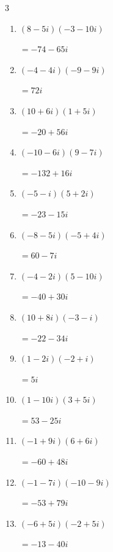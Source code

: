 \begin{multicols}{3}
\begin{enumerate}
        $\displaystyle =-44-28i$

  \item $\displaystyle (8-5i)(-3-10i)$

        $\displaystyle =-74-65i$

\columnbreak %

  \item $\displaystyle (-4-4i)(-9-9i)$

        $\displaystyle =72i$

  \item $\displaystyle (10+6i)(1+5i)$

        $\displaystyle =-20+56i$

  \item $\displaystyle (-10-6i)(9-7i)$

        $\displaystyle =-132+16i$

  \item $\displaystyle (-5-i)(5+2i)$

        $\displaystyle =-23-15i$

  \item $\displaystyle (-8-5i)(-5+4i)$

        $\displaystyle =60-7i$

  \item $\displaystyle (-4-2i)(5-10i)$

        $\displaystyle =-40+30i$

  \item $\displaystyle (10+8i)(-3-i)$

        $\displaystyle =-22-34i$

  \item $\displaystyle (1-2i)(-2+i)$

        $\displaystyle =5i$

  \item $\displaystyle (1-10i)(3+5i)$

        $\displaystyle =53-25i$

  \item $\displaystyle (-1+9i)(6+6i)$

        $\displaystyle =-60+48i$

  \item $\displaystyle (-1-7i)(-10-9i)$

        $\displaystyle =-53+79i$

  \item $\displaystyle (-6+5i)(-2+5i)$

        $\displaystyle =-13-40i$


\end{enumerate}
\end{multicols}

